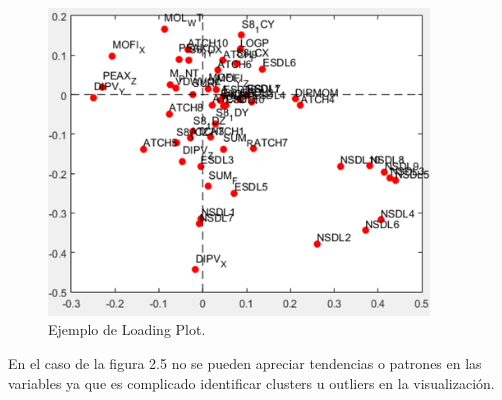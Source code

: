 \begin{figure}[H]
\centering
\includegraphics[width=0.9\textwidth]{imagenes/figuras/2_6.png}
\caption{Ejemplo de Loading Plot.}
\end{figure}

En el caso de la figura 2.5 no se pueden apreciar tendencias o patrones en las variables ya que es complicado identificar clusters  u outliers en la visualización.